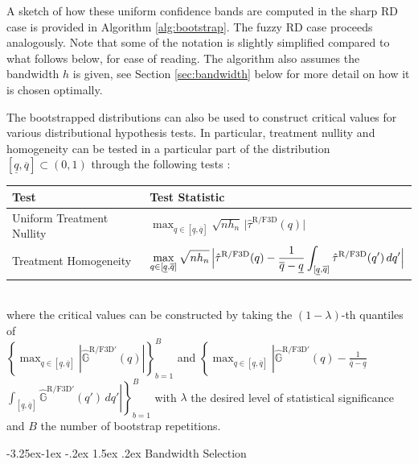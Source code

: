 \documentclass[12pt]{article}
\makeatletter
\renewcommand\subsection{\@startsection{subsection}{2}{\z@}%
  {-3.25ex\@plus -1ex \@minus -.2ex}%
  {1.5ex \@plus .2ex}%
  {\itshape\large\center}} %
\makeatother
\begin{document}
A sketch of how these uniform confidence bands are computed in the sharp RD case is provided in Algorithm \ref{alg:bootstrap}. The fuzzy RD case proceeds analogously. Note that some of the notation is slightly simplified compared to what follows below, for ease of reading. The algorithm also assumes the bandwidth $h$ is given, see Section \ref{sec:bandwidth} below for more detail on how it is chosen optimally. 


The bootstrapped distributions can also be used to construct critical values for various distributional hypothesis tests. In particular, treatment nullity and homogeneity can be tested in a particular part of the distribution $[\underline{q}, \overline{q}] \subset (0,1)$ through the following tests \citep{chiang2019causal}:
\begin{table}[htbp!]
\centering
\begin{tabular}{ll}
\hline
Test  & Test Statistic \\
\hline
Uniform Treatment Nullity
& 
\(\displaystyle \max_{q \in [\underline{q}, \overline{q}]} \sqrt{nh_n}\,\bigl|\hat{\tau}^{\mathrm{R/F3D}}(q)\bigr|\) 
\\[1em]
Treatment Homogeneity
& 
\(\displaystyle \max_{q \in [\underline{q}, \overline{q}]} \sqrt{nh_n}\,\Bigl|\hat{\tau}^\mathrm{R/F3D}(q) - \frac{1}{\overline{q} - \underline{q}}\int_{[\underline{q}, \overline{q}]} \hat{\tau}^\mathrm{R/F3D}(q')\,dq'\Bigr|\)
\\
\hline
\end{tabular}
\end{table} \\
\noindent where the critical values can be constructed by taking the $(1-\lambda)$-th quantiles of \\ $ \left\{ \max_{q \in [\underline{q}, \overline{q}]} \left| \hat{\mathbb{G}}^{\mathrm{R/F3D}'}(q) \right| \right\}_{b=1}^B$ and  $\left\{ \max_{q \in [\underline{q}, \overline{q}]} \left| \hat{\mathbb{G}}^{\mathrm{R/F3D}'}(q) - \frac{1}{\overline{q}-\underline{q}}\right.\right.$\linebreak[1]
$\left.\left.\int_{[\underline{q}, \overline{q}]}\hat{\mathbb{G}}^{\mathrm{R/F3D}'}(q')\,dq' \right| \right\}_{b=1}^B$ with $\lambda$ the desired level of statistical significance and $B$ the number of bootstrap repetitions. 

\subsection{Bandwidth Selection} \label{sec:bandwidth}
\end{document}
